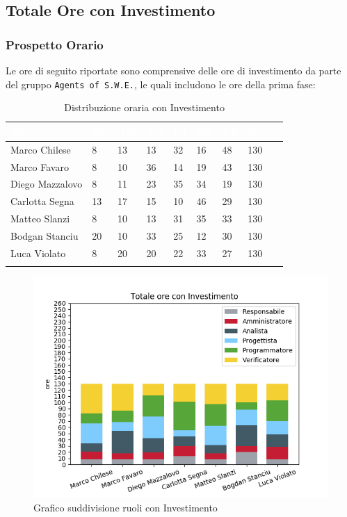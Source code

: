 \newpage
\subsection{Totale Ore con Investimento}
\label{PTI}
\subsubsection{Prospetto Orario}

Le ore di seguito riportate sono comprensive delle ore di investimento da parte del gruppo \texttt{Agents of S.W.E.}, le quali includono le ore della prima fase:

\begin{longtable}{|C{.30\textwidth}|C{.06\textwidth}|C{.06\textwidth}|C{.06\textwidth} | C{.06\textwidth}| C{.06\textwidth} | C{.06\textwidth} | C{.10\textwidth} |}
\hline
{}	\textbf{\textcolor{white}{Nome}} & \textbf{\textcolor{white}{RE}} & \textbf{\textcolor{white}{AM}} & \textbf{\textcolor{white}{AN}} & \textbf{\textcolor{white}{PJ}} & \textbf{\textcolor{white}{PR}} & \textbf{\textcolor{white}{VE}} & \textbf{\textcolor{white}{Totale}}\\
\hline 
Marco Chilese & 8 & 13 & 13 & 32 & 16 & 48 & 130\\
\hline
{}Marco Favaro & 8 & 10 & 36 & 14 & 19 & 43 & 130\\
\hline
Diego Mazzalovo & 8 & 11 & 23 & 35 & 34 & 19 & 130\\
\hline
{}Carlotta Segna & 13 & 17 & 15 & 10 & 46 & 29 & 130\\
\hline
Matteo Slanzi & 8 & 10 & 13 & 31 & 35 & 33 & 130\\
\hline
{}Bodgan Stanciu & 20 & 10 & 33 & 25 & 12 & 30 & 130\\
\hline
Luca Violato & 8 & 20 & 20 & 22 & 33 & 27 & 130 \\
\hline


\caption{Distribuzione oraria con Investimento}
\label{Distribuzione oraria delle ore con investimento}
\end{longtable}

\begin{figure}[H]
	\centering
  		\includegraphics[width=0.8\linewidth]{./images/fig_toi.png}
  		\caption{Grafico suddivisione ruoli con Investimento}
  		\label{fig:grafico suddivione ruoli con investimento}
\end{figure}

